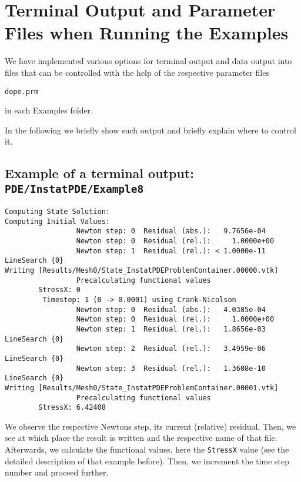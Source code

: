 \chapter{Terminal Output  and Parameter Files when Running the Examples}
\label{sec_terminal_output}
We have implemented various options for terminal output and 
data output into files that can be controlled with the help of 
the respective parameter files
\begin{verbatim}
dope.prm
\end{verbatim}
in each Examples folder.

In the following we briefly show such output and briefly 
explain where to control it.
\section{Example of a terminal output: \texttt{PDE/InstatPDE/Example8}}

\begin{verbatim}
Computing State Solution:
Computing Initial Values:
                 Newton step: 0  Residual (abs.):   9.7656e-04
                 Newton step: 0  Residual (rel.):     1.0000e+00
                 Newton step: 1  Residual (rel.): < 1.0000e-11   LineSearch {0} 
Writing [Results/Mesh0/State_InstatPDEProblemContainer.00000.vtk]
                 Precalculating functional values 
        StressX: 0
         Timestep: 1 (0 -> 0.0001) using Crank-Nicolson
                 Newton step: 0  Residual (abs.):   4.0385e-04
                 Newton step: 0  Residual (rel.):     1.0000e+00
                 Newton step: 1  Residual (rel.):   1.8656e-03   LineSearch {0} 
                 Newton step: 2  Residual (rel.):   3.4959e-06   LineSearch {0} 
                 Newton step: 3  Residual (rel.):   1.3608e-10   LineSearch {0} 
Writing [Results/Mesh0/State_InstatPDEProblemContainer.00001.vtk]
                 Precalculating functional values 
        StressX: 6.42408
\end{verbatim}

We observe the respective Newtons step, its current (relative) residual. 
Then, we see at which place the result is written and the respective 
name of that file. Afterwards, we calculate the functional values, here the 
\texttt{StressX} value (see the detailed description of that example before).
Then, we increment the time step number and proceed further.


